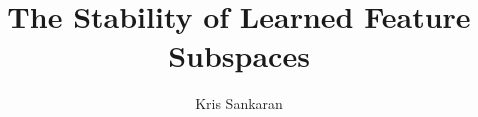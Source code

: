 \documentclass{article}
\title{The Stability of Learned Feature Subspaces}
\author{Kris Sankaran}
\begin{document}
\maketitle

\graphicspath{{figure/}}










 
\end{document}

